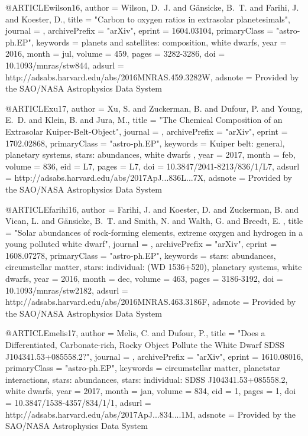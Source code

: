 \documentclass[a4paper,fleqn,usenatbib]{mnras}
\begin{document}
{{{{{@ARTICLE{wilson16,
   author = {{Wilson}, D.~J. and {G{\"a}nsicke}, B.~T. and {Farihi}, J. and 
	{Koester}, D.},
    title = "{Carbon to oxygen ratios in extrasolar planetesimals}",
  journal = {\mnras},
archivePrefix = "arXiv",
   eprint = {1604.03104},
 primaryClass = "astro-ph.EP",
 keywords = {planets and satellites: composition, white dwarfs},
     year = 2016,
    month = jul,
   volume = 459,
    pages = {3282-3286},
      doi = {10.1093/mnras/stw844},
   adsurl = {http://adsabs.harvard.edu/abs/2016MNRAS.459.3282W},
  adsnote = {Provided by the SAO/NASA Astrophysics Data System}
}

@ARTICLE{xu17,
   author = {{Xu}, S. and {Zuckerman}, B. and {Dufour}, P. and {Young}, E.~D. and 
	{Klein}, B. and {Jura}, M.},
    title = "{The Chemical Composition of an Extrasolar Kuiper-Belt-Object}",
  journal = {\apjl},
archivePrefix = "arXiv",
   eprint = {1702.02868},
 primaryClass = "astro-ph.EP",
 keywords = {Kuiper belt: general, planetary systems, stars: abundances, white dwarfs },
     year = 2017,
    month = feb,
   volume = 836,
      eid = {L7},
    pages = {L7},
      doi = {10.3847/2041-8213/836/1/L7},
   adsurl = {http://adsabs.harvard.edu/abs/2017ApJ...836L...7X},
  adsnote = {Provided by the SAO/NASA Astrophysics Data System}
}


@ARTICLE{farihi16,
   author = {{Farihi}, J. and {Koester}, D. and {Zuckerman}, B. and {Vican}, L. and 
	{G{\"a}nsicke}, B.~T. and {Smith}, N. and {Walth}, G. and {Breedt}, E.
	},
    title = "{Solar abundances of rock-forming elements, extreme oxygen and hydrogen in a young polluted white dwarf}",
  journal = {\mnras},
archivePrefix = "arXiv",
   eprint = {1608.07278},
 primaryClass = "astro-ph.EP",
 keywords = {stars: abundances, circumstellar matter, stars: individual: (WD 1536+520), planetary systems, white dwarfs},
     year = 2016,
    month = dec,
   volume = 463,
    pages = {3186-3192},
      doi = {10.1093/mnras/stw2182},
   adsurl = {http://adsabs.harvard.edu/abs/2016MNRAS.463.3186F},
  adsnote = {Provided by the SAO/NASA Astrophysics Data System}
}


@ARTICLE{melis17,
   author = {{Melis}, C. and {Dufour}, P.},
    title = "{Does a Differentiated, Carbonate-rich, Rocky Object Pollute the White Dwarf SDSS J104341.53+085558.2?}",
  journal = {\apj},
archivePrefix = "arXiv",
   eprint = {1610.08016},
 primaryClass = "astro-ph.EP",
 keywords = {circumstellar matter, planet{\ndash}star interactions, stars: abundances, stars: individual: SDSS J104341.53+085558.2, white dwarfs},
     year = 2017,
    month = jan,
   volume = 834,
      eid = {1},
    pages = {1},
      doi = {10.3847/1538-4357/834/1/1},
   adsurl = {http://adsabs.harvard.edu/abs/2017ApJ...834....1M},
  adsnote = {Provided by the SAO/NASA Astrophysics Data System}
}


}}}}}
\end{document}
